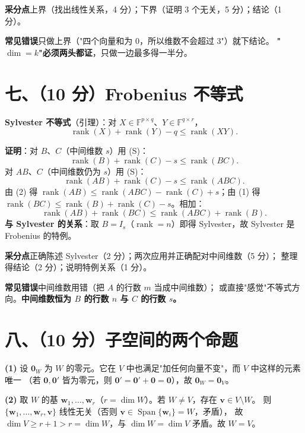 \documentclass[11pt]{ctexart}
\newcommand{\FF}{\mathbb{F}}
\newcommand{\rank}{\operatorname{rank}}
\newcommand{\Span}{\operatorname{Span}}
\begin{document}
\begin{scorebox}
\textbf{采分点}\quad 上界（找出线性关系，4 分）；下界（证明 3 个无关，5 分）；结论（1 分）。

\textbf{常见错误}\quad 只做上界（"四个向量和为 0，所以维数不会超过 3"）就下结论。
\textbf{"$\dim=k$"必须两头都证}，只做一边最多得一半分。
\end{scorebox}

\section*{七、（10 分）Frobenius 不等式}

\begin{ansbox}
\textbf{Sylvester 不等式}（引理）：对 $X\in\FF^{p\times q}$、$Y\in\FF^{q\times r}$，
\[
\rank(X)+\rank(Y)-q\le\rank(XY). \tag{S}
\]

\textbf{证明}：对 $B$、$C$（中间维数 $s$）用 (S)：
\[
\rank(B)+\rank(C)-s\le\rank(BC). \tag{1}
\]
对 $AB$、$C$（中间维数仍为 $s$）用 (S)：
\[
\rank(AB)+\rank(C)-s\le\rank(ABC). \tag{2}
\]
由 (2) 得 $\rank(AB)\le\rank(ABC)-\rank(C)+s$；由 (1) 得 $\rank(BC)\le\rank(B)+\rank(C)-s$。相加：
\[
\rank(AB)+\rank(BC)\le\rank(ABC)+\rank(B).
\]
\textbf{与 Sylvester 的关系}：取 $B=I_s$（$\rank=n$）即得 Sylvester，故 Sylvester 是 Frobenius 的特例。
\end{ansbox}

\begin{scorebox}
\textbf{采分点}\quad 正确陈述 Sylvester（2 分）；两次应用并正确配对中间维数（5 分）；
整理得结论（2 分）；说明特例关系（1 分）。

\textbf{常见错误}\quad 中间维数用错（把 $A$ 的行数 $m$ 当成中间维数）；
或直接"感觉"不等式方向。\textbf{中间维数恒为 $B$ 的行数 $n$ 与 $C$ 的行数 $s$。}
\end{scorebox}

\section*{八、（10 分）子空间的两个命题}

\begin{ansbox}
\textbf{(1)} 设 $\mathbf 0_W$ 为 $W$ 的零元。它在 $V$ 中也满足"加任何向量不变"，而 $V$ 中这样的元素唯一
（若 $\mathbf 0,\mathbf 0'$ 皆为零元，则 $\mathbf 0'=\mathbf 0'+\mathbf 0=\mathbf 0$），故 $\mathbf 0_W=\mathbf 0_V$。

\textbf{(2)} 取 $W$ 的基 $\mathbf w_1,\dots,\mathbf w_r$（$r=\dim W$）。若 $W\ne V$，存在 $\mathbf v\in V\setminus W$。
则 $\{\mathbf w_1,\dots,\mathbf w_r,\mathbf v\}$ 线性无关（否则 $\mathbf v\in\Span\{\mathbf w_i\}=W$，矛盾），
故 $\dim V\ge r+1>r=\dim W$，与 $\dim W=\dim V$ 矛盾。故 $W=V$。
\end{ansbox}
\end{document}
